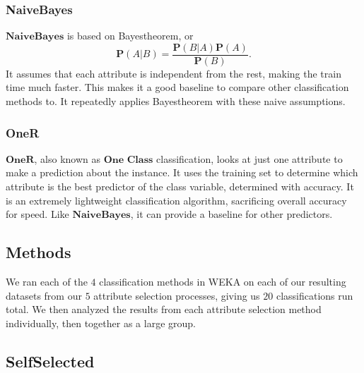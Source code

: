 \documentclass[12pt]{article}
\begin{document}
\subsubsection{NaiveBayes}
$\textbf{NaiveBayes}$ is based on Bayes\textquotesingle  theorem, or $$\textbf{P}(A|B) = \frac{\textbf{P}(B|A)\textbf{P}(A)}{\textbf{P}(B)}.$$ It assumes that each attribute is independent from the rest, making the train time much faster. This makes it a good baseline to compare other classification methods to. It repeatedly applies Bayes\textquotesingle  theorem with these naive assumptions. 

\subsubsection{OneR}
$\textbf{OneR}$, also known as $\textbf{One Class}$ classification, looks at just one attribute to make a prediction about the instance. It uses the training set to determine which attribute is the best predictor of the class variable, determined with accuracy. It is an extremely lightweight classification algorithm, sacrificing overall accuracy for speed. Like $\textbf{NaiveBayes}$, it can provide a baseline for other predictors. 

\subsection{Methods}
We ran each of the $4$ classification methods in WEKA on each of our resulting datasets from our $5$ attribute selection processes, giving us $20$ classifications run total. We then analyzed the results from each attribute selection method individually, then together as a large group. 

\subsection{SelfSelected}
\end{document}
